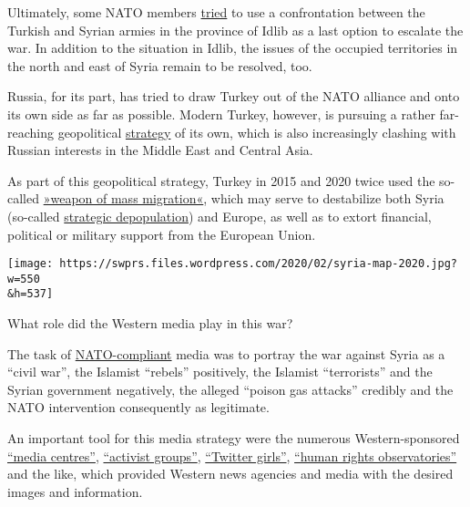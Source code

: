Ultimately, some NATO members
\href{https://uk.reuters.com/article/uk-syria-security-turkey-usa/us-condemns-idlib-assaults-stands-by-turkey-secretary-of-state-pompeo-idUKKBN1ZY2FH}{tried}
to use a confrontation between the Turkish and Syrian armies in the
province of Idlib as a last option to escalate the war. In addition to
the situation in Idlib, the issues of the occupied territories in the
north and east of Syria remain to be resolved, too.

Russia, for its part, has tried to draw Turkey out of the NATO alliance
and onto its own side as far as possible. Modern Turkey, however, is
pursuing a rather far-reaching geopolitical
\href{https://foreignpolicy.com/2016/10/23/turkeys-religious-nationalists-want-ottoman-borders-iraq-erdogan/}{strategy}
of its own, which is also increasingly clashing with Russian interests
in the Middle East and Central Asia.

As part of this geopolitical strategy, Turkey in 2015 and 2020 twice
used the so-called
\href{https://en.wikipedia.org/wiki/Refugees_as_weapons}{»weapon of mass
migration«}, which may serve to destabilize both Syria (so-called
\href{https://www.rt.com/news/319797-syria-depopulation-refugees-assange/}{strategic
depopulation}) and Europe, as well as to extort financial, political or
military support from the European Union.

\texttt{[image: https://swprs.files.wordpress.com/2020/02/syria-map-2020.jpg?w=550\\\&h=537]}

What role did the Western media play in this war?

The task of
\href{https://swprs.org/the-american-empire-and-its-media/}{NATO-compliant}
media was to portray the war against Syria as a ``civil war'', the
Islamist ``rebels'' positively, the Islamist ``terrorists'' and the
Syrian government negatively, the alleged ``poison gas attacks''
credibly and the NATO intervention consequently as legitimate.

An important tool for this media strategy were the numerous
Western-sponsored
\href{https://www.middleeasteye.net/news/revealed-british-government-covert-propaganda-campaign-syria}{``media
centres''},
\href{https://www.unz.com/pgiraldi/the-fraud-of-the-white-helmets/}{``activist
groups''},
\href{https://www.middleeasteye.net/news/twitter-executive-also-part-time-officer-uk-army-psychological-warfare-unit}{``Twitter
girls''},
\href{https://thegrayzone.com/2018/06/06/syrian-observatory-for-human-rights-funding-sohr-uk-government/}{``human
rights observatories''} and the like, which provided Western news
agencies and media with the desired images and information.

